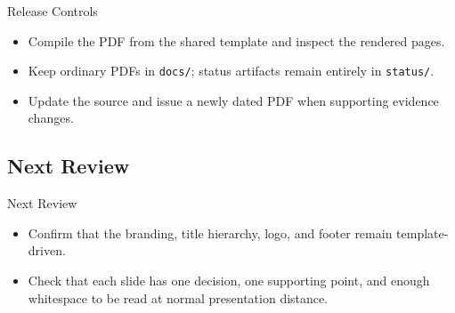 \documentclass[aspectratio=169]{beamer}
\begin{document}
\begin{frame}{Release Controls}
  \begin{itemize}[<1->]
    \item Compile the PDF from the shared template and inspect the rendered pages.
    \item Keep ordinary PDFs in \texttt{docs/}; status artifacts remain entirely in \texttt{status/}.
    \item Update the source and issue a newly dated PDF when supporting evidence changes.
  \end{itemize}
\end{frame}

\subsection{Next Review}

\begin{frame}{Next Review}
  \begin{itemize}[<1->]
    \item Confirm that the branding, title hierarchy, logo, and footer remain template-driven.
    \item Check that each slide has one decision, one supporting point, and enough whitespace to be read at normal presentation distance.
  \end{itemize}
\end{frame}
\end{document}
